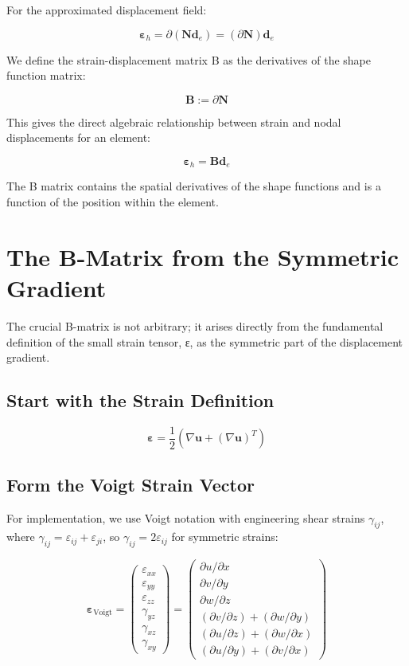 \documentclass[
  11pt,
  a4paper,
]{scrbook}
\begin{document}
For the approximated displacement field:

\[\boldsymbol{\varepsilon}_h = \partial \left( \mathbf{N}\mathbf{d}_e \right) = \left( \partial\mathbf{N} \right) \mathbf{d}_e\]

We define the strain-displacement matrix B as the derivatives of the
shape function matrix:

\[\mathbf{B} := \partial\mathbf{N}\]

This gives the direct algebraic relationship between strain and nodal
displacements for an element:

\[\boldsymbol{\varepsilon}_h = \mathbf{B} \mathbf{d}_e\]

The B matrix contains the spatial derivatives of the shape functions and
is a function of the position within the element.

\section{The B-Matrix from the Symmetric
Gradient}\label{the-b-matrix-from-the-symmetric-gradient}

The crucial B-matrix is not arbitrary; it arises directly from the
fundamental definition of the small strain tensor, ε, as the symmetric
part of the displacement gradient.

\subsection{Start with the Strain
Definition}\label{start-with-the-strain-definition}

\[\boldsymbol{\varepsilon} = \frac{1}{2} \left( \nabla\mathbf{u} + (\nabla\mathbf{u})^T \right)\]

\subsection{Form the Voigt Strain
Vector}\label{form-the-voigt-strain-vector}

For implementation, we use Voigt notation with engineering shear strains
\(\gamma_{ij}\), where
\(\gamma_{ij} = \varepsilon_{ij} + \varepsilon_{ji}\), so
\(\gamma_{ij} = 2\varepsilon_{ij}\) for symmetric strains:

\[\boldsymbol{\varepsilon}_{\text{Voigt}} = \begin{pmatrix} \varepsilon_{xx} \\ \varepsilon_{yy} \\ \varepsilon_{zz} \\ \gamma_{yz} \\ \gamma_{xz} \\ \gamma_{xy} \end{pmatrix} = \begin{pmatrix} \partial u / \partial x \\ \partial v / \partial y \\ \partial w / \partial z \\ (\partial v / \partial z) + (\partial w / \partial y) \\ (\partial u / \partial z) + (\partial w / \partial x) \\ (\partial u / \partial y) + (\partial v / \partial x) \end{pmatrix}\]
\end{document}
